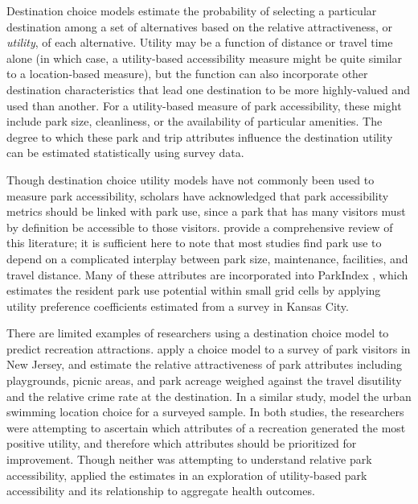 \documentclass[3p, authoryear, review]{elsarticle} %
\begin{document}
Destination choice models estimate the probability of selecting a particular
destination among a set of alternatives based on the relative attractiveness, or
\emph{utility}, of each alternative. Utility may be a function of distance or travel
time alone (in which case, a utility-based accessibility measure might be quite
similar to a location-based measure), but the function can also incorporate
other destination characteristics that lead one destination to be more
highly-valued and used than another. For a utility-based measure of park accessibility,
these might include park size, cleanliness, or the availability of particular
amenities. The degree to which these park and trip attributes influence the
destination utility can be estimated statistically using survey data.

Though destination choice utility models have not commonly been used to measure
park accessibility, scholars have acknowledged that park accessibility metrics
should be linked with park use, since a park that has many visitors must by
definition be accessible to those visitors. \citet{McCormack2010} provide a
comprehensive review of this literature; it is sufficient here to note that most
studies find park use to depend on a complicated interplay between park size,
maintenance, facilities, and travel distance. Many of these attributes are
incorporated into ParkIndex \citep{Kaczynski2016}, which estimates the resident park
use potential within small grid cells by applying utility preference
coefficients estimated from a survey in Kansas City.

There are limited examples of researchers using a destination choice model to
predict recreation attractions. \citet{Kinnell2006} apply a choice model to a survey of
park visitors in New Jersey, and estimate the relative attractiveness of park
attributes including playgrounds, picnic areas, and park acreage weighed against
the travel disutility and the relative crime rate at the destination. In a
similar study, \citet{Meyerhoff2010} model the urban swimming location choice for a
surveyed sample. In both studies, the researchers were attempting to ascertain
which attributes of a recreation generated the most positive utility, and
therefore which attributes should be prioritized for improvement. Though neither
was attempting to understand relative park accessibility, \citet{macfarlaneNYC} applied
the \citet{Kinnell2006} estimates in an exploration of utility-based park accessibility
and its relationship to aggregate health outcomes.
\end{document}
